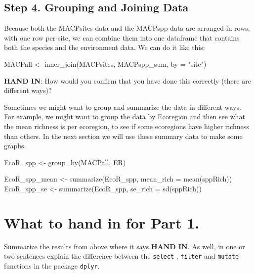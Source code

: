 \documentclass[
]{book}
\newenvironment{Shaded}{\begin{snugshade}}{\end{snugshade}}
\newcommand{\AttributeTok}[1]{\textcolor[rgb]{0.77,0.63,0.00}{#1}}
\newcommand{\FunctionTok}[1]{\textcolor[rgb]{0.00,0.00,0.00}{#1}}
\newcommand{\NormalTok}[1]{#1}
\newcommand{\OtherTok}[1]{\textcolor[rgb]{0.56,0.35,0.01}{#1}}
\newcommand{\StringTok}[1]{\textcolor[rgb]{0.31,0.60,0.02}{#1}}
\begin{document}
\hypertarget{step-4.-grouping-and-joining-data}{%
\section{Step 4. Grouping and Joining Data}\label{step-4.-grouping-and-joining-data}}

Because both the MACPsites data and the MACPspp data are arranged in rows, with one row per site, we can combine them into one dataframe that contains both the species and the environment data. We can do it like this:

\begin{Shaded}
\begin{Highlighting}[]
\NormalTok{MACPall }\OtherTok{\textless{}{-}} \FunctionTok{inner\_join}\NormalTok{(MACPsites, MACPspp\_sum, }\AttributeTok{by =} \StringTok{"site"}\NormalTok{)}
\end{Highlighting}
\end{Shaded}

\textbf{HAND IN}: How would you confirm that you have done this correctly (there are different ways)?

Sometimes we might want to group and summarize the data in different ways. For example, we might want to group the data by Ecoregion and then see what the mean richness is per ecoregion, to see if some ecoregions have higher richness than others. In the next section we will use these summary data to make some graphs.

\begin{Shaded}
\begin{Highlighting}[]
\NormalTok{EcoR\_spp }\OtherTok{\textless{}{-}} \FunctionTok{group\_by}\NormalTok{(MACPall, ER)}

\NormalTok{EcoR\_spp\_mean }\OtherTok{\textless{}{-}} \FunctionTok{summarize}\NormalTok{(EcoR\_spp, }\AttributeTok{mean\_rich =} \FunctionTok{mean}\NormalTok{(sppRich))}
\NormalTok{EcoR\_spp\_se }\OtherTok{\textless{}{-}} \FunctionTok{summarize}\NormalTok{(EcoR\_spp, }\AttributeTok{se\_rich =} \FunctionTok{sd}\NormalTok{(sppRich))}
\end{Highlighting}
\end{Shaded}

\hypertarget{what-to-hand-in-for-part-1.}{%
\chapter{What to hand in for Part 1.}\label{what-to-hand-in-for-part-1.}}

Summarize the results from above where it says \textbf{HAND IN}. As well, in one or two sentences explain the difference between the \texttt{select} , \texttt{filter} and \texttt{mutate} functions in the package \texttt{dplyr}.
\end{document}
